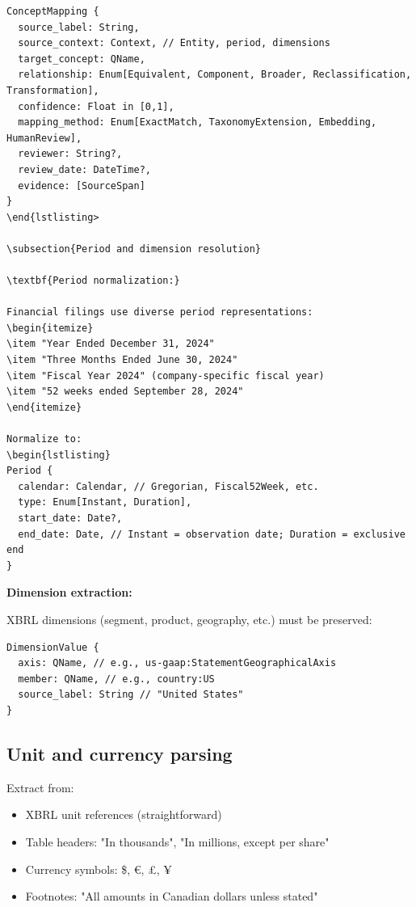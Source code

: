 \begin{lstlisting}
ConceptMapping {
  source_label: String,
  source_context: Context, // Entity, period, dimensions
  target_concept: QName,
  relationship: Enum[Equivalent, Component, Broader, Reclassification, Transformation],
  confidence: Float in [0,1],
  mapping_method: Enum[ExactMatch, TaxonomyExtension, Embedding, HumanReview],
  reviewer: String?,
  review_date: DateTime?,
  evidence: [SourceSpan]
}
\end{lstlisting>

\subsection{Period and dimension resolution}

\textbf{Period normalization:}

Financial filings use diverse period representations:
\begin{itemize}
\item "Year Ended December 31, 2024"
\item "Three Months Ended June 30, 2024"
\item "Fiscal Year 2024" (company-specific fiscal year)
\item "52 weeks ended September 28, 2024"
\end{itemize}

Normalize to:
\begin{lstlisting}
Period {
  calendar: Calendar, // Gregorian, Fiscal52Week, etc.
  type: Enum[Instant, Duration],
  start_date: Date?,
  end_date: Date, // Instant = observation date; Duration = exclusive end
}
\end{lstlisting}

\textbf{Dimension extraction:}

XBRL dimensions (segment, product, geography, etc.) must be preserved:

\begin{lstlisting}
DimensionValue {
  axis: QName, // e.g., us-gaap:StatementGeographicalAxis
  member: QName, // e.g., country:US
  source_label: String // "United States"
}
\end{lstlisting}

\subsection{Unit and currency parsing}

Extract from:
\begin{itemize}
\item XBRL unit references (straightforward)
\item Table headers: "In thousands", "In millions, except per share"
\item Currency symbols: \$, €, £, ¥
\item Footnotes: "All amounts in Canadian dollars unless stated"
\end{itemize}

